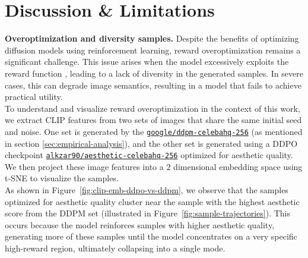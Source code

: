 \section{Discussion \& Limitations}

\noindent\textbf{Overoptimization and diversity samples.} Despite the benefits 
of optimizing diffusion models using reinforcement learning, reward overoptimization remains a significant challenge. This issue arises when the model excessively exploits the reward function \cite{gao2023scaling}, leading to a lack of diversity in the generated samples. In severe cases, this can degrade image semantics, resulting in a model that fails to achieve practical utility. \\

\noindent To understand and visualize reward overoptimization in the context of this work, we extract CLIP \cite{radford2021learning} features from two sets of images that share the same initial seed and noise. One set is generated by the \href{https://huggingface.co/google/ddpm-celebahq-256}{\texttt{google/ddpm-celebahq-256}} (as mentioned in section \ref{sec:empirical-analysis}), and the other set is generated using a DDPO checkpoint \href{https://huggingface.co/alkzar90/ddpo-aesthetic-celebahq-256}{\texttt{alkzar90/aesthetic-celebahq-256}} optimized for aesthetic quality. We then  project these image features into a $2$ dimensional embedding space using t-SNE \cite{van2008visualizing} to visualize the samples. \\

\noindent As shown in Figure~\ref{fig:clip-emb-ddpo-vs-ddpm}, we observe that the samples optimized for aesthetic quality cluster near the sample with the highest aesthetic score from the DDPM set (illustrated in Figure~\ref{fig:sample-trajectories}). This occurs because the model reinforces samples with higher aesthetic quality, generating more of these samples until the
model concentrates on a very specific high-reward region, ultimately collapsing into a single mode. \\

